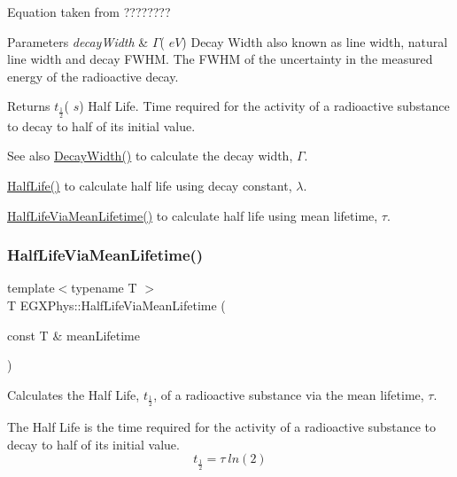 Equation taken from ????????


\begin{DoxyParams}{Parameters}
{\em decay\+Width} & $\Gamma$( $eV$) Decay Width also known as line width, natural line width and decay F\+W\+HM. The F\+W\+HM of the uncertainty in the measured energy of the radioactive decay. \\
\hline
\end{DoxyParams}
\begin{DoxyReturn}{Returns}
$t_{\frac{1}{2}}$( $s$) Half Life. Time required for the activity of a radioactive substance to decay to half of its initial value. 
\end{DoxyReturn}
\begin{DoxySeeAlso}{See also}
\hyperlink{group___decay_width_gae232ec8bb39710131be898c057a25620}{Decay\+Width()} to calculate the decay width, $\Gamma$. 

\hyperlink{group___half_life_ga21d268f154fb91c1c556bbfa7fe83ac1}{Half\+Life()} to calculate half life using decay constant, $\lambda$. 

\hyperlink{group___half_life_gacddef16b62e98b214ec8dd8af7da7dce}{Half\+Life\+Via\+Mean\+Lifetime()} to calculate half life using mean lifetime, $\tau$. 
\end{DoxySeeAlso}
\mbox{\label{group___half_life_gacddef16b62e98b214ec8dd8af7da7dce}} 
\subsubsection{\texorpdfstring{Half\+Life\+Via\+Mean\+Lifetime()}{HalfLifeViaMeanLifetime()}}
{\footnotesize\ttfamily template$<$typename T $>$ \\
T E\+G\+X\+Phys\+::\+Half\+Life\+Via\+Mean\+Lifetime (\begin{DoxyParamCaption}\item[{const T \&}]{mean\+Lifetime }\end{DoxyParamCaption})}



Calculates the Half Life, $t_{\frac{1}{2}}$, of a radioactive substance via the mean lifetime, $\tau$. 

The Half Life is the time required for the activity of a radioactive substance to decay to half of its initial value. \[t_{\frac{1}{2}}= \tau \ ln(2)\]

